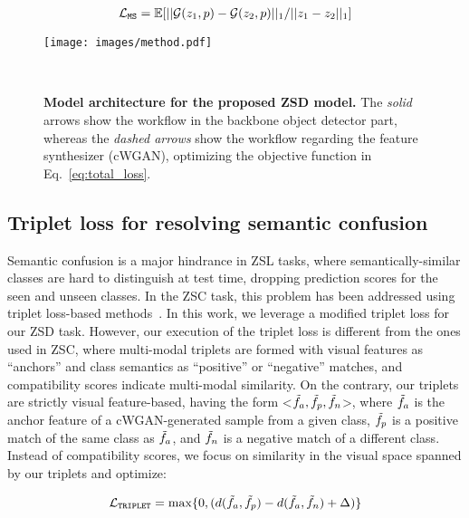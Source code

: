 \documentclass{bmvc2k}
\begin{document}
\begin{align}
	\label{eq:ms}
	\mathcal{L}_{\tt MS} = \mathbb{E}[ || \mathcal{G}(z_1, p) - \mathcal{G}(z_2, p) ||_1 / || z_1 - z_2 ||_1]
\end{align}



\begin{figure}[t]
	\centering
	\texttt{[image: images/method.pdf]}
	\caption{{\bf Model architecture for the proposed ZSD model.} The {\em solid} arrows show the workflow in the backbone object detector part, whereas the {\em dashed arrows} show the workflow regarding the feature synthesizer (cWGAN), optimizing the objective function in Eq.~\ref{eq:total_loss}.}  \
	\label{fig:zsd-model}
	
\end{figure} 

\subsection{Triplet loss for resolving semantic confusion}
\label{sec:sem-confusion}


Semantic confusion is a major hindrance in ZSL tasks, where semantically-similar classes are hard to distinguish at test time, dropping prediction scores for the seen and unseen classes. In the ZSC task, this problem has been addressed using triplet loss-based methods~\cite{akata2015label, frome2013devise}. In this work, we leverage a modified triplet loss for our ZSD task. However, our execution of the triplet loss is different from the ones used in ZSC, where multi-modal triplets are formed with visual features as ``anchors'' and class semantics as ``positive'' or ``negative'' matches, and compatibility scores indicate multi-modal similarity. On the contrary, our triplets are strictly visual feature-based, having the form <$\Tilde{f}_a, \Tilde{f}_p, \Tilde{f}_n$>, where $\Tilde{f}_a$ is the anchor feature of a cWGAN-generated sample from a given class, $\Tilde{f}_p$ is a positive match of the same class as $\Tilde{f}_a$, and $\Tilde{f}_n$ is a negative match of a different class. Instead of compatibility scores, we focus on similarity in the visual space spanned by our triplets and optimize:

\begin{align}
	\label{eq:triplet}
	\mathcal{L}_{\tt TRIPLET} = \max \{ 0, (d(\Tilde{f}_a, \Tilde{f}_p) - d(\Tilde{f}_a, \Tilde{f}_n) + \Delta) \}
\end{align}
\end{document}
